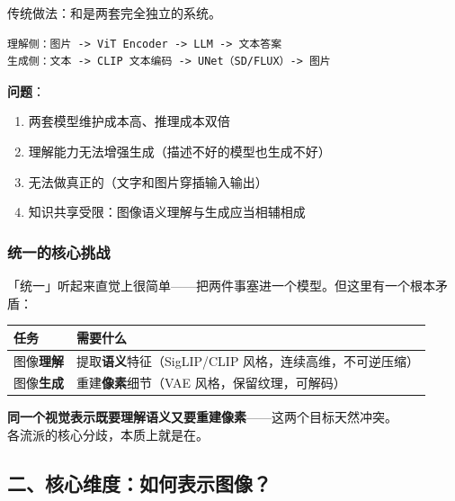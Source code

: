 传统做法：和是两套完全独立的系统。

\begin{lstlisting}
理解侧：图片 -> ViT Encoder -> LLM -> 文本答案
生成侧：文本 -> CLIP 文本编码 -> UNet（SD/FLUX）-> 图片
\end{lstlisting}

\begin{warnbox}
\textbf{问题}：
\begin{enumerate}
  \item 两套模型维护成本高、推理成本双倍
  \item 理解能力无法增强生成（描述不好的模型也生成不好）
  \item 无法做真正的（文字和图片穿插输入输出）
  \item 知识共享受限：图像语义理解与生成应当相辅相成
\end{enumerate}
\end{warnbox}

\subsubsection{统一的核心挑战}

\begin{intubox}
「统一」听起来直觉上很简单——把两件事塞进一个模型。但这里有一个根本矛盾：
\end{intubox}

\begin{center}
{\small
\begin{tabular}{|l|l|}
\hline
\textbf{任务} & \textbf{需要什么} \\
\hline
图像\textbf{理解} & 提取\textbf{语义}特征（SigLIP/CLIP 风格，连续高维，不可逆压缩） \\
图像\textbf{生成} & 重建\textbf{像素}细节（VAE 风格，保留纹理，可解码） \\
\hline
\end{tabular}
}
\end{center}

\begin{warnbox}
\textbf{同一个视觉表示既要理解语义又要重建像素}——这两个目标天然冲突。\\
各流派的核心分歧，本质上就是在。
\end{warnbox}

\subsection{二、核心维度：如何表示图像？}

